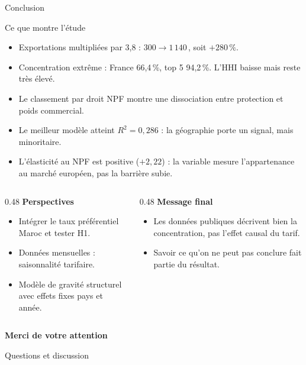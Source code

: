 \documentclass[aspectratio=169,10pt]{beamer}
\newcommand{\MUSD}{\,\text{M USD}}
\begin{document}
\begin{frame}{Conclusion}
  \begin{block}{Ce que montre l'étude}
    \begin{itemize}
      \item Exportations multipliées par 3,8 : $300 \rightarrow
            1\,140$\MUSD{}, soit $+280\,\%$.
      \item Concentration extrême : France 66,4\,\%, top 5 94,2\,\%.
            L'HHI baisse mais reste très élevé.
      \item Le classement par droit NPF montre une dissociation entre
            protection et poids commercial.
      \item Le meilleur modèle atteint $R^2 = 0{,}286$ : la géographie
            porte un signal, mais minoritaire.
      \item L'élasticité au NPF est positive ($+2{,}22$) : la variable
            mesure l'appartenance au marché européen, pas la barrière
            subie.
    \end{itemize}
  \end{block}
  \vspace{0.8em}
  \begin{columns}[T,onlytextwidth]
    \begin{column}{0.48\textwidth}
      \textbf{Perspectives}
      \begin{itemize}
        \item Intégrer le taux préférentiel Maroc et tester H1.
        \item Données mensuelles : saisonnalité tarifaire.
        \item Modèle de gravité structurel avec effets fixes pays et année.
      \end{itemize}
    \end{column}
    \begin{column}{0.48\textwidth}
      \textbf{Message final}
      \begin{itemize}
        \item Les données publiques décrivent bien la concentration, pas
              l'effet causal du tarif.
        \item Savoir ce qu'on ne peut pas conclure fait partie du
              résultat.
      \end{itemize}
    \end{column}
  \end{columns}
\end{frame}

\begin{frame}[plain]
  \centering
  \vfill
  {\Huge\bfseries\color{bleu} Merci de votre attention}
  \vspace{1.2em}

  {\large Questions et discussion}
  \vfill
\end{frame}
\end{document}
